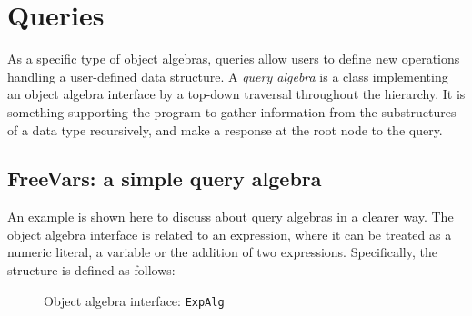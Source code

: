 \section{Queries}\label{sec:queries}

As a specific type of object algebras, queries allow users to define
new operations handling a user-defined data structure. A \textit{query
  algebra} is a class implementing an object algebra interface by a
top-down traversal throughout the hierarchy. It is something
supporting the program to gather information from the substructures of
a data type recursively, and make a response at the root node to the
query.
\begin{comment}
\bruno{Haoyuan: please stop using ``$\backslash\backslash$" after every paragraph!
A normal paragraph is created by having an empty line, not by using
``$\backslash\backslash$". The ``$\backslash\backslash$" command is only for forcing a new line.}
\end{comment}
\begin{comment}
Write a new definition. Class or interface?
\end{comment}

\subsection{FreeVars: a simple query algebra}\label{subsec:freevars}

An example is shown here to discuss about query algebras in a clearer
way. The object algebra interface is related to an expression, where
it can be treated as a numeric literal, a variable or the addition of
two expressions. Specifically, the structure is defined as follows:

\begin{figure}[!htbp]
\vspace{-.1in}
\caption{Object algebra interface: \lstinline{ExpAlg}}
\label{exp_alg}
\end{figure}
\begin{comment}
\bruno{Don't copy the code! Use the code from the
  repository directly via the ruby script! The same applies to the
  other pieces of code in the rest of the paper.}
\end{comment}

